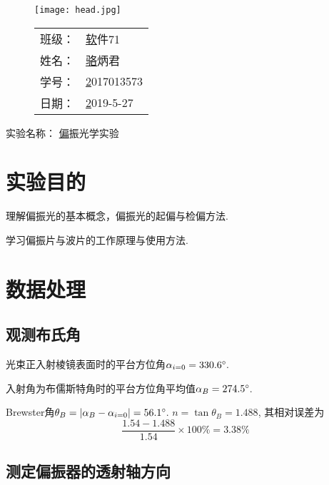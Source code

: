 \documentclass{thureport}
\newcommand{\major}{软件71}
\newcommand{\name}{骆炳君}
\newcommand{\stuid}{2017013573}
\newcommand{\newdate}{2019-5-27}
\newcommand{\newtitle}{偏振光学实验}
\def\de{{\ensuremath{^\circ\hspace{-0.09em}}}}
\begin{document}
\thispagestyle{empty}
\begin{figure}[h]
	\begin{minipage}{0.65\linewidth}
		\centerline{\texttt{[image: head.jpg]}}
	\end{minipage}
	\hfill
	\begin{minipage}{.3\linewidth}
		\raggedleft
		\begin{tabular*}{.8\linewidth}{ll}
			班级： & \underline\major   \\
			姓名： & \underline\name    \\
			学号： & \underline\stuid   \\
			日期： & \underline\newdate
		\end{tabular*}
	\end{minipage}
\end{figure}

\begin{table}[!htbp]
	\centering\large
	实验名称： \underline\newtitle
\end{table}

\tableofcontents
\newpage

\section{实验目的}
\begin{clause}
	\item 理解偏振光的基本概念，偏振光的起偏与检偏方法.
	\item 学习偏振片与波片的工作原理与使用方法.
\end{clause}

\section{数据处理}
\subsection{观测布氏角}
光束正入射棱镜表面时的平台方位角$\alpha_{i=0}=330.6\de$.

入射角为布儒斯特角时的平台方位角平均值$\alpha_{B}=274.5\de$.

Brewster角$\theta_{B}=|\alpha_B-\alpha_{i=0}|=56.1\de$. $n=\tan{\theta_B}=1.488$, 其相对误差为
$$\frac{1.54-1.488}{1.54}\times100\%=3.38\%$$

\subsection{测定偏振器的透射轴方向}
\end{document}
